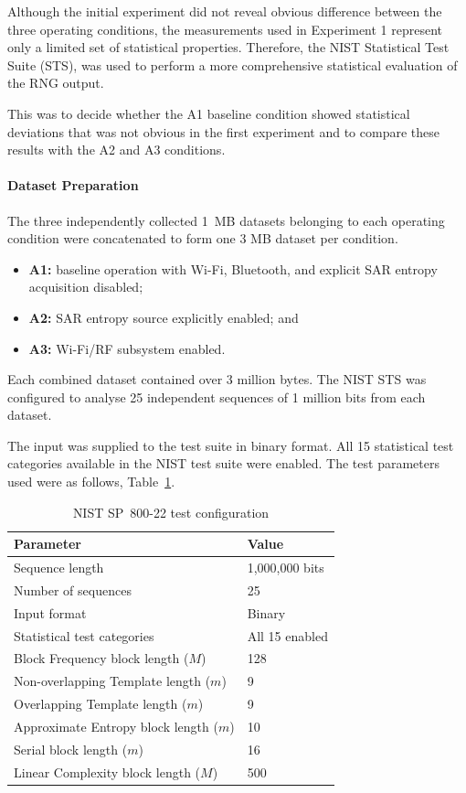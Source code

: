 \documentclass[a4paper, 12pt]{article}
\begin{document}
Although the initial experiment did not reveal obvious
difference between the three operating conditions, the measurements used in
Experiment 1 represent only a limited set of statistical properties.
Therefore, the NIST Statistical Test Suite (STS), was used to perform a more comprehensive statistical evaluation of the RNG output.

This was to decide whether the A1 baseline condition showed statistical deviations
that was not obvious in the first experiment and to compare these results
with the A2 and A3 conditions.

\paragraph{Dataset Preparation}

The three independently collected 1~MB datasets belonging to each operating
condition were concatenated to form one 3 MB dataset per condition. 

\begin{itemize}
    \item \textbf{A1:} baseline operation with Wi-Fi, Bluetooth, and explicit
    SAR entropy acquisition disabled;
    \item \textbf{A2:} SAR entropy source explicitly enabled; and
    \item \textbf{A3:} Wi-Fi/RF subsystem enabled.
\end{itemize}

Each combined dataset contained over 3 million bytes. The NIST STS was configured to analyse 25 independent
sequences of 1 million bits from each dataset.

The input was supplied to the test suite in binary format. All 15 statistical
test categories available in the NIST test suite were enabled.
The test parameters used were as follows,
Table~\ref{tab:nist_sts_parameters}.

\begin{table}[htbp]
    \centering
    \caption{NIST SP~800-22 test configuration}
    \label{tab:nist_sts_parameters}
    \begin{tabular}{ll}
        \toprule
        \textbf{Parameter} & \textbf{Value} \\
        \midrule
        Sequence length & 1,000,000 bits \\
        Number of sequences & 25 \\
        Input format & Binary \\
        Statistical test categories & All 15 enabled \\
        Block Frequency block length ($M$) & 128 \\
        Non-overlapping Template length ($m$) & 9 \\
        Overlapping Template length ($m$) & 9 \\
        Approximate Entropy block length ($m$) & 10 \\
        Serial block length ($m$) & 16 \\
        Linear Complexity block length ($M$) & 500 \\
        \bottomrule
    \end{tabular}
\end{table}
\end{document}
